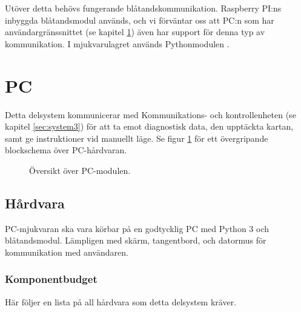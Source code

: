 \documentclass[a4paper,11pt]{article}
\begin{document}
Utöver detta behövs fungerande blåtandskommunikation. Raspberry PI:ns inbyggda blåtandsmodul används, och vi förväntar oss att PC:n som har användargränssnittet (se kapitel \ref{sec:system4}) även har support för denna typ av kommunikation. I mjukvarulagret används Pythonmodulen \cite{pybluez}.

\newpage
\section{PC} \label{sec:system4}
Detta delsystem kommunicerar med Kommunikations- och kontrollenheten (se kapitel \ref{sec:system3}) för att ta emot diagnostisk data, den upptäckta kartan, samt ge instruktioner vid manuellt läge. Se figur \ref{fig:unitPC} för ett övergripande blockschema över PC-hårdvaran.

\begin{figure}[h!]
    \caption{Översikt över PC-modulen.}
    \label{fig:unitPC}
\end{figure}
\subsection{Hårdvara}
PC-mjukvaran ska vara körbar på en godtycklig PC med Python 3 och blåtandsmodul. Lämpligen med skärm, tangentbord, och datormus för kommunikation med användaren.

\subsubsection{Komponentbudget}
Här följer en lista på all hårdvara som detta delsystem kräver.

\begin{center}
\end{center}
\end{document}
